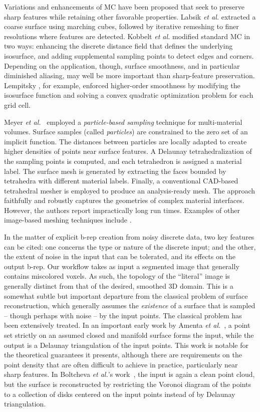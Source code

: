 Variations and enhancements of MC have been proposed that seek to preserve sharp features while retaining other favorable properties.  Labsik \textit{et al.} \cite{labsik_2002} extracted a coarse surface using marching cubes, followed by iterative remeshing to finer resolutions where features are detected.  Kobbelt \textit{et al.} \cite{kobbelt_2001} modified standard MC in two ways:  enhancing the discrete distance field that defines the underlying isosurface, and adding supplemental sampling points to detect edges and corners. Depending on the application, though, surface smoothness, and in particular diminished aliasing, may well be more important than sharp-feature preservation. Lempitsky \cite{lempitsky_2010}, for example, enforced higher-order smoothness by modifying the isosurface function and solving a convex quadratic optimization problem for each grid cell.

Meyer \textit{et al.}~\cite{meyer_2008} employed a \textit{particle-based sampling} technique for multi-material volumes. Surface samples (called \textit{particles}) are constrained to the zero set of an implicit function. The distances between particles are locally adapted to create higher densities of points near surface features. A Delaunay tetrahedralization of the sampling points is computed, and each tetrahedron is assigned a material label. The surface mesh is generated by extracting the faces bounded by tetrahedra with different material labels. Finally, a conventional CAD-based tetrahedral mesher is employed to produce an analysis-ready mesh. The approach faithfully and robustly captures the geometries of complex material interfaces. However, the authors report impractically long run times.
Examples of other image-based meshing techniques include \cite{fang_2009, mohamed_2004, jermyn_2013, boissonnat_2009}.

In the matter of explicit b-rep creation from noisy discrete data, two key features can be cited:  one concerns the type or nature of the discrete input; and the other, the extent of noise in the input that can be tolerated, and its effects on the output b-rep.  Our workflow takes as input a segmented image that generally contains miscolored voxels.  As such, the topology of the ``literal'' image is generally distinct from that of the desired, smoothed 3D domain.  This is a somewhat subtle but important departure from the classical problem of surface reconstruction, which generally assumes the {\em existence} of a surface that is sampled -- though perhaps with noise -- by the input points.  The classical problem has been extensively treated.  In an important early work by Amenta \textit{et al.}~\cite{amenta2000}, a point set strictly on an assumed closed and manifold surface forms the input, while the output is a Delaunay triangulation of the input points.  This work is notable for the theoretical guarantees it presents, although there are requirements on the point density that are often difficult to achieve in practice, particularly near sharp features.  In Boltcheva \textit{et al.}'s work~\cite{boltcheva2017}, the input is again a clean point cloud, but the surface is reconstructed by restricting the Voronoi diagram of the points to a collection of disks centered on the input points instead of by Delaunay triangulation.

